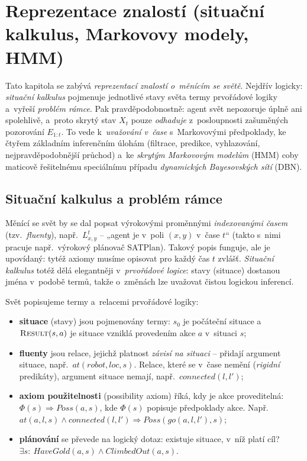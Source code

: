 \section{Reprezentace znalostí (situační kalkulus, Markovovy modely, HMM)}

Tato kapitola se zabývá \emph{reprezentací znalostí o~měnícím se světě}. Nejdřív logicky: \emph{situační kalkulus} pojmenuje jednotlivé stavy světa termy prvořádové logiky a~vyřeší \emph{problém rámce}. Pak pravděpodobnostně: agent svět nepozoruje úplně ani spolehlivě, a~proto skrytý stav $X_t$ pouze \emph{odhaduje} z~posloupnosti zašuměných pozorování $E_{1:t}$. To vede k~\emph{uvažování v~čase} s~Markovovými předpoklady, ke čtyřem základním inferenčním úlohám (filtrace, predikce, vyhlazování, nejpravděpodobnější průchod) a~ke \emph{skrytým Markovovým modelům} (HMM) coby maticově řešitelnému speciálnímu případu \emph{dynamických Bayesovských sítí} (DBN).

\subsection{Situační kalkulus a problém rámce}

Měnící se svět by se dal popsat výrokovými proměnnými \emph{indexovanými časem} (tzv.\ \emph{fluenty}), např.\ $L^t_{x,y}$ -- „agent je v~poli $(x,y)$ v~čase $t$`` (takto s~nimi pracuje např.\ výrokový plánovač SATPlan). Takový popis funguje, ale je upovídaný: tytéž axiomy musíme opisovat pro každý čas $t$ zvlášť. \emph{Situační kalkulus} totéž dělá elegantněji v~\emph{prvořádové logice}: stavy (situace) dostanou jména v~podobě termů, takže o~změnách lze uvažovat čistou logickou inferencí.

\begin{definice}
Svět popisujeme termy a~relacemi prvořádové logiky:
\begin{itemize}
  \item \textbf{situace} (stavy) jsou pojmenovány termy: $s_0$ je počáteční situace a~$\textsc{Result}(s,a)$ je situace vzniklá provedením akce $a$ v~situaci $s$;
  \item \textbf{fluenty} jsou relace, jejichž platnost \emph{závisí na situaci} -- přidají argument situace, např.\ $\mathit{at}(\mathit{robot},\mathit{loc},s)$. Relace, které se v~čase nemění (\emph{rigidní} predikáty), argument situace nemají, např.\ $\mathit{connected}(l,l')$;
  \item \textbf{axiom použitelnosti} (possibility axiom) říká, kdy je akce proveditelná: $\Phi(s) \Rightarrow \mathit{Poss}(a,s)$, kde $\Phi(s)$ popisuje předpoklady akce. Např.\ $\mathit{at}(a,l,s)\wedge \mathit{connected}(l,l') \Rightarrow \mathit{Poss}(\mathit{go}(a,l,l'),s)$;
  \item \textbf{plánování} se převede na logický dotaz: existuje situace, v~níž platí cíl?\quad $\exists s:\ \mathit{HaveGold}(a,s)\wedge \mathit{ClimbedOut}(a,s)$.
\end{itemize}
\end{definice}

